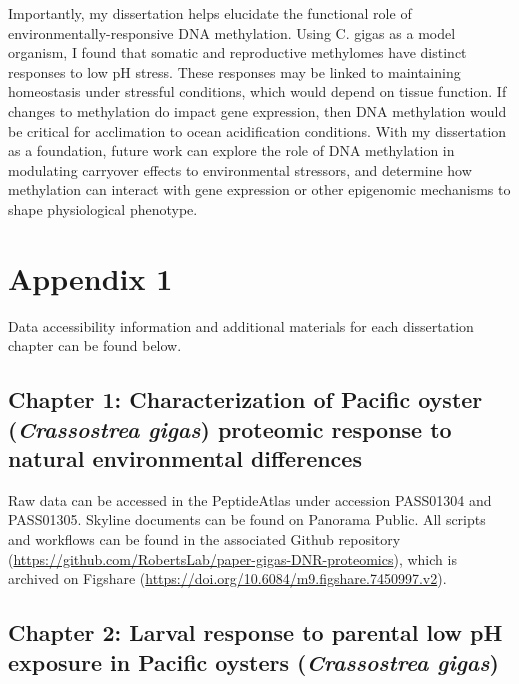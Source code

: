 \documentclass [11pt, proquest] {uwthesis}[2015/03/03]
\begin{document}
Importantly, my dissertation helps elucidate the functional role of environmentally-responsive DNA methylation. Using C. gigas as a model organism, I found that somatic and reproductive methylomes have distinct responses to low pH stress. These responses may be linked to maintaining homeostasis under stressful conditions, which would depend on tissue function. If changes to methylation do impact gene expression, then DNA methylation would be critical for acclimation to ocean acidification conditions. With my dissertation as a foundation, future work can explore the role of DNA methylation in modulating carryover effects to environmental stressors, and determine how methylation can interact with gene expression or other epigenomic mechanisms to shape physiological phenotype.

\appendix

\hypertarget{appendix-1}{%
\chapter{Appendix 1}\label{appendix-1}}

Data accessibility information and additional materials for each dissertation chapter can be found below.

\hypertarget{chapter-1-characterization-of-pacific-oyster-crassostrea-gigas-proteomic-response-to-natural-environmental-differences}{%
\section{\texorpdfstring{Chapter 1: Characterization of Pacific oyster (\emph{Crassostrea gigas}) proteomic response to natural environmental differences}{Chapter 1: Characterization of Pacific oyster (Crassostrea gigas) proteomic response to natural environmental differences}}\label{chapter-1-characterization-of-pacific-oyster-crassostrea-gigas-proteomic-response-to-natural-environmental-differences}}

Raw data can be accessed in the PeptideAtlas under accession PASS01304 and PASS01305. Skyline documents can be found on Panorama Public. All scripts and workflows can be found in the associated Github repository (\url{https://github.com/RobertsLab/paper-gigas-DNR-proteomics}), which is archived on Figshare (\url{https://doi.org/10.6084/m9.figshare.7450997.v2}).

\hypertarget{chapter-2-larval-response-to-parental-low-ph-exposure-in-pacific-oysters-crassostrea-gigas}{%
\section{\texorpdfstring{Chapter 2: Larval response to parental low pH exposure in Pacific oysters (\emph{Crassostrea gigas})}{Chapter 2: Larval response to parental low pH exposure in Pacific oysters (Crassostrea gigas)}}\label{chapter-2-larval-response-to-parental-low-ph-exposure-in-pacific-oysters-crassostrea-gigas}}
\end{document}
